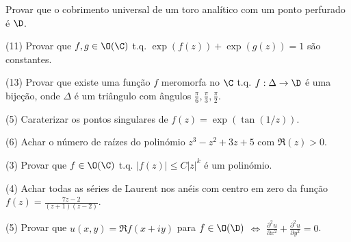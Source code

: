 \begin{prob}[(9)(mestrado)]
Provar que o cobrimento universal de um toro analítico com um ponto perfurado
é $\D$.
\end{prob}

\begin{prob} (11)
Provar que 
$f,g\in\O(\C)$ t.q. $\exp(f(z)) + \exp(g(z)) = 1$
são constantes.
\end{prob}

\begin{prob} (13)
Provar que existe uma função $f$ meromorfa no $\C$ t.q. $f : \Delta \to \D$ é uma bijeção,
onde $\Delta$ é um triângulo com ângulos $\frac{\pi}{6},\frac{\pi}{3},\frac{\pi}{2}$.
\end{prob}

\begin{prob} (5)
Caraterizar os pontos singulares de $f(z) = \exp(\tan(1/z))$.
\end{prob}

\begin{prob} (6)
Achar o número de raízes do polinómio $z^3-z^2+3z+5$ com $\Re(z)>0$.
\end{prob}

\begin{prob} (3)
Provar que $f\in\O(\C)$ t.q. $|f(z)|\leq C |z|^k$ é um polinómio.
\end{prob}

\begin{prob} (4)
Achar todas as séries de Laurent nos anéis com centro em zero da função $f(z) = \frac{7z-2}{(z+1)(z-2)}$.
\end{prob}

\begin{prob} (5)
Provar que $u(x,y) = \Re f(x+iy)$ para $f\in\O(\D)$ $\iff$ 
$\frac{\partial^2 u}{\partial x^2} + \frac{\partial^2 u}{\partial y^2} = 0$.
\end{prob}




